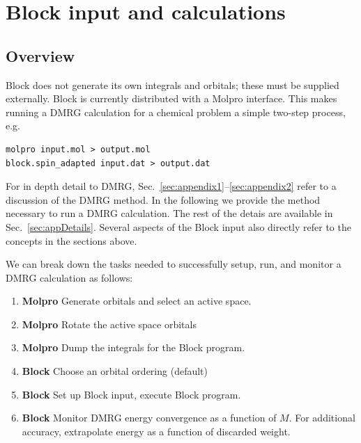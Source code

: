 \documentclass[letterpaper,12pt,aps, pra]{revtex4-1}
\begin{document}
\section{Block input and calculations}

\subsection{Overview}

Block does not generate its own integrals and orbitals; these must be supplied externally. Block
is currently distributed  with a Molpro interface. This makes running a DMRG calculation for a chemical problem a simple two-step process, e.g.
\begin{verbatim}
molpro input.mol > output.mol
block.spin_adapted input.dat > output.dat
\end{verbatim}

For in depth detail to DMRG, Sec.~\ref{sec:appendix1}--\ref{sec:appendix2}
refer to a discussion of the DMRG method.  In the following we provide the
method necessary to run a DMRG calculation.  The rest of the detais are
available in Sec.~\ref{sec:appDetails}.  Several aspects of the Block input
also directly refer to the concepts in the sections above.

We can break down the tasks needed to successfully setup, run, and monitor a DMRG calculation as follows:
\begin{enumerate}
\item {\bf Molpro} Generate orbitals and select an active space. 
\item {\bf Molpro} Rotate the active space orbitals
\item {\bf Molpro} Dump the integrals for the Block program.
\item {\bf Block} Choose an orbital ordering (default)
\item {\bf Block} Set up Block input, execute Block program.
\item {\bf Block} Monitor DMRG energy convergence as a function of $M$. For additional accuracy, extrapolate energy as a function of discarded weight. 
\end{enumerate}

\end{document}
